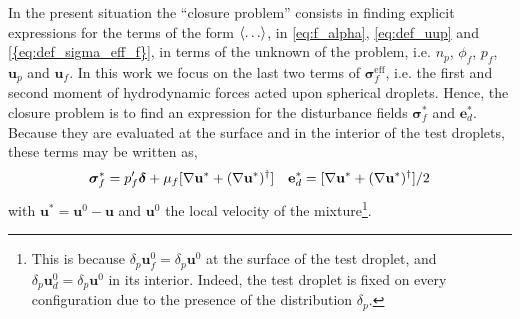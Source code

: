 In the present situation the ``closure problem'' consists in finding explicit expressions for the terms of the form $\left<\ldots\right>$, in \ref{eq:f_alpha}, \ref{eq:def_uup} and \ref{{eq:def_sigma_eff_f}}, in terms of the unknown of the problem, i.e. $n_p$, $\phi_f$, $p_f$, $\textbf{u}_p$ and $\textbf{u}_f$. 
In this work we focus on the last two terms of $\bm\sigma^\text{eff}_f$, i.e. the first and second moment of hydrodynamic forces acted upon spherical droplets.
Hence, the closure problem is to find an expression for the disturbance fields $\bm\sigma_f^*$ and $\textbf{e}_d^*$. 
Because they are evaluated at the surface and in the interior of the test droplets, these terms may be written as, 
\begin{align}
    \bm\sigma_f^* =p_f' \bm\delta 
    + \mu_f [\grad \textbf{u}^* + (\grad \textbf{u}^*)^\dagger]
    && 
    \textbf{e}_d^* = [\grad \textbf{u}^* + (\grad \textbf{u}^*)^\dagger] /2
    \label{eq:conditional_average}
\end{align}
with $\textbf{u}^* = \textbf{u}^0 - \textbf{u}$ and $\textbf{u}^0$ the local velocity of the mixture\footnote{
    This is because $\delta_p \textbf{u}^0_f=\delta_p  \textbf{u}^0$ at the surface of the test droplet, and $\delta_p \textbf{u}_d^0 = \delta_p \textbf{u}^0$ in its interior.
    Indeed, the test droplet is fixed on every configuration due to the presence of the distribution $\delta_p$. 
}. 

